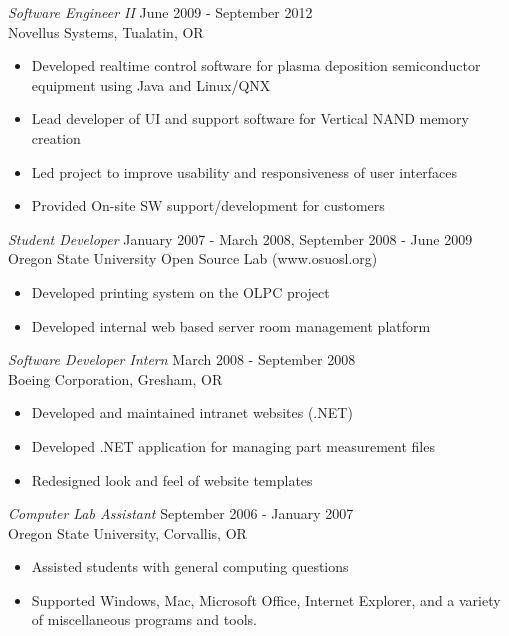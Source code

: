 \documentclass[margin]{res}
\begin{document}
\begin{resume}
                {\sl Software Engineer II} \hfill June 2009 -  September 2012 \\
                Novellus Systems,  Tualatin, OR 
                 \begin{itemize}  \itemsep -2pt
                    \item Developed realtime control software for plasma deposition semiconductor equipment using Java and Linux/QNX
                    \item Lead developer of UI and support software for Vertical NAND memory creation 
                    \item Led project to improve usability and responsiveness of user interfaces
                    \item Provided On-site SW support/development for customers
                \end{itemize}
                
                {\sl Student Developer} \hfill            January 2007 - March 2008, September 2008 - June 2009 \\
                Oregon State University Open Source Lab (www.osuosl.org)
                 \begin{itemize}  \itemsep -2pt %
                     \item Developed printing system on the OLPC project
                     \item Developed internal web based server room management platform
                 \end{itemize}

                {\sl Software Developer Intern} \hfill         March 2008 - September 2008\\
                Boeing Corporation, Gresham, OR
                   \begin{itemize}  \itemsep -2pt %
                    \item Developed and maintained intranet websites (.NET)
                    \item Developed .NET application for managing part measurement files
                    \item Redesigned look and feel of website templates
                   \end{itemize}

                {\sl Computer Lab Assistant} \hfill         September 2006 - January 2007\\
                Oregon State University, Corvallis, OR
                \begin{itemize}  \itemsep -2pt %
                    \item Assisted students with general computing questions
                    \item Supported Windows, Mac, Microsoft Office, Internet Explorer, and a variety
                        of miscellaneous programs and tools.
                \end{itemize}



\end{resume}
\end{document}
